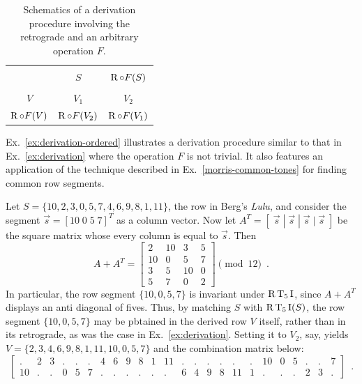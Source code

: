 \begin{table}[htbp]
	\cite[212]{Starr1984}
    \caption[Derivation Involving the Retrograde and an Arbitrary Operation]{Schematics of a derivation procedure involving the retrograde and an arbitrary operation $F$.}
    \label{derivation-retrograde}
    \centering
    \vspace{12pt}
    \begin{tabular}{c|cc}
        \hline\\
        & $S$ & $\operatorname{R} \circ F(S)$ \\
        \hline\\
        $V$ & $V_1$ & $V_2$ \\
        $\operatorname{R} \circ F(V)$ & $\operatorname{R} \circ F(V_2)$ & $\operatorname{R} \circ F(V_1)$ \\
        \hline
    \end{tabular}
\end{table}

Ex.~\ref{ex:derivation-ordered} illustrates a derivation procedure similar to that in Ex.~\ref{ex:derivation} where the operation $F$ is not trivial. It also features an application of the technique described in Ex.~\ref{morris-common-tones} for finding common row segments.

\begin{example}
    \label{ex:derivation-ordered}
    Let $S = \{ 10, 2, 3, 0, 5, 7, 4, 6, 9, 8, 1, 11 \}$, the row in Berg's \emph{Lulu}, and consider the segment $\vec{s} = [10 \; 0 \; 5 \; 7]^T$ as a column vector. Now let $A^T = [\;\vec{s} \; | \; \vec{s} \; | \; \vec{s} \; | \; \vec{s}\;]$ be the square matrix whose every column is equal to $\vec{s}$. Then
	\begin{equation}
    	A + A^T = \begin{bmatrix}
    		2 & 10 & 3 & 5 \\
        	10 & 0 & 5 & 7 \\
        	3 & 5 & 10 & 0 \\
        	5 & 7 & 0 & 2
        \end{bmatrix} \pmod{12} \enspace.
	\end{equation}
	\noindent In particular, the row segment $\{ 10, 0, 5, 7 \}$ is invariant under $\operatorname{R}\operatorname{T}_5\operatorname{I}$, since $A + A^T$ displays an anti diagonal of fives. Thus, by matching $S$ with $\operatorname{R}\operatorname{T}_5\operatorname{I}(S)$, the row segment $\{ 10, 0, 5, 7 \}$ may be pbtained in the derived row $V$ itself, rather than in its retrograde, as was the case in Ex.~\ref{ex:derivation}. Setting it to $V_2$, say, yields $V = \{ 2, 3, 4, 6, 9, 8, 1, 11, 10, 0, 5, 7 \}$ and the combination matrix below:
	\begin{equation}
    	\left[
    	\begin{array}{cccccccccccc|cccccccccccc}
        	. & 2 & 3 & . & . & . & 4 & 6 & 9 & 8 & 1 & 11 & . & . & . & . & . & . & 10 & 0 & 5 & . & . & 7 \\
        	10 & . & . & 0 & 5 & 7 & . & . & . & . & . & . & 6 & 4 & 9 & 8 & 11 & 1 & . & . & . & 2 & 3 & .
    	\end{array}
    	\right] \enspace.
	\end{equation}
\end{example}

